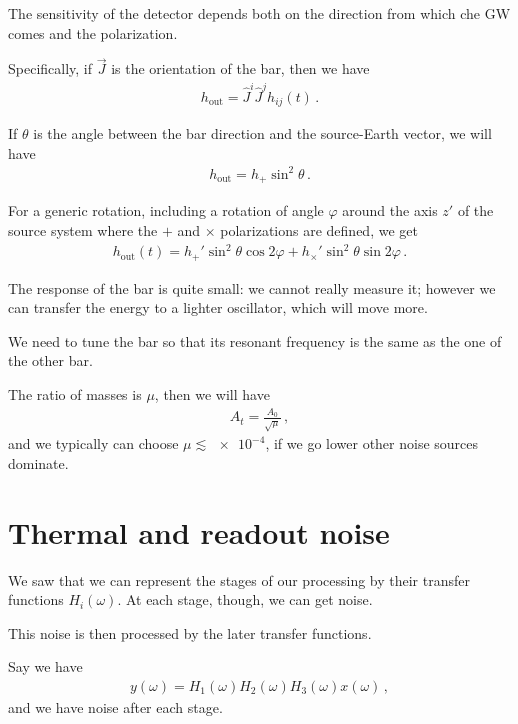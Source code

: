 \documentclass[main.tex]{subfiles}
\begin{document}
The sensitivity of the detector depends both on the direction from which che GW comes and the polarization.

Specifically, if \(\vec{J}\) is the orientation of the bar, then we have 
%
\begin{align}
h _{\text{out}} = \hat{J}^{i} \hat{J}^{j} h_{ij} (t)
\,.
\end{align}

If \(\theta \) is the angle between the bar direction and the source-Earth vector, we will have 
%
\begin{align}
h _{\text{out}} = h_{+} \sin^2\theta 
\,.
\end{align}

For a generic rotation, including a rotation of angle \(\varphi \) around the axis \(z'\) of the source system where the \(+\) and \(\times \) polarizations are defined, we get 
%
\begin{align}
h _{\text{out}} (t) = h_{+}' \sin^2\theta \cos 2 \varphi + h_{ \times }' \sin^2 \theta \sin 2 \varphi 
\,.
\end{align}

The response of the bar is quite small: we cannot really measure it; however we can transfer the energy to a lighter oscillator, which will move more. 

We need to tune the bar so that its resonant frequency is the same as the one of the other bar. 

The ratio of masses is \(\mu \), then we will have 
%
\begin{align}
A_t = \frac{A_0 }{\sqrt{\mu }}
\,,
\end{align}
%
and we typically can choose \(\mu \lesssim \num{e-4}\), if we go lower other noise sources dominate.

\section{Thermal and readout noise}

We saw that we can represent the stages of our processing by their transfer functions \(H_{i}(\omega )\). At each stage, though, we can get noise.

This noise is then processed by the later transfer functions. 

Say we have 
%
\begin{align}
y(\omega ) = H_1 (\omega ) H_2 (\omega ) H_3 (\omega ) x(\omega )
\,,
\end{align}
%
and we have noise after each stage. 
\end{document}
